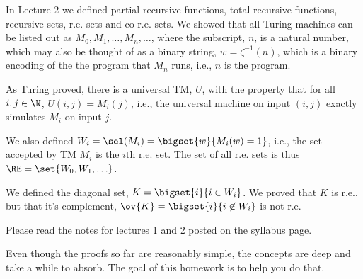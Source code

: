 \documentclass[12pt]{article}
\begin{document}
\thispagestyle{empty}
\noindent{}
\addtocounter{section}{2}

In Lecture 2 we defined partial recursive functions, total recursive functions, recursive sets,
r.e. sets and co-r.e. sets. We showed that all Turing machines can be listed out as $M_0, M_1, 
\ldots, M_n, \ldots$, where the subscript, $n$, is a natural number, which may also be thought of as a binary
string, $w = \zeta^{-1}(n)$, which is a binary encoding of the the program that $M_n$ runs, i.e.,
$n$ is the program. 

As Turing proved, there is a universal TM, $U$, with the property that for all $i,j\in\N$, $U(i,j) =
M_i(j)$, i.e., the universal machine on input $(i,j)$ exactly simulates $M_i$ on input $j$.

We also defined $W_i = \sel(M_i) = \bigset{w}{M_i(w) = 1}$, i.e., the set accepted by TM $M_i$ is
the $i$th r.e. set.  The set of all r.e. sets is thus $\RE = \set{W_0, W_1, \ldots}$.

We defined the diagonal set, $K = \bigset{i}{i \in W_i}$. We proved that $K$ is r.e., but that it's
complement, $\ov{K}  = \bigset{i}{i \not\in W_i}$ is not r.e.

Please read the notes for lectures 1 and 2 posted on the syllabus page.

Even though the proofs so far are reasonably simple, the concepts are deep and take a while to
absorb.  The goal of this homework is to help you do that.
\end{document}
